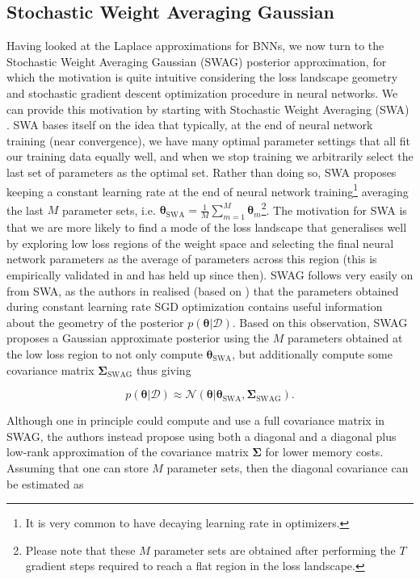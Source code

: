 \subsection{Stochastic Weight Averaging Gaussian}
\label{sec:SWAG}
Having looked at the Laplace approximations for BNNs, we now turn to the Stochastic Weight Averaging Gaussian (SWAG) \citep{2019_SWAG} posterior approximation, for which the motivation is quite intuitive considering the loss landscape geometry and stochastic gradient descent optimization procedure in neural networks. We can provide this motivation by starting with Stochastic Weight Averaging (SWA) \citep{2018_SWA}. SWA bases itself on the idea that typically, at the end of neural network training (near convergence), we have many optimal parameter settings that all fit our training data equally well, and when we stop training we arbitrarily select the last set of parameters as the optimal set. Rather than doing so, SWA proposes keeping a constant learning rate at the end of neural network training\footnote{It is very common to have decaying learning rate in optimizers.} averaging the last $M$ parameter sets, i.e. $\bm{\theta}_\text{SWA}=\frac{1}{M}\sum^M_{m=1}\bm{\theta}_m$\footnote{Please note that these $M$ parameter sets are obtained after performing the $T$ gradient steps required to reach a flat region in the loss landscape.}. The motivation for SWA is that we are more likely to find a mode of the loss landscape that generalises well by exploring low loss regions of the weight space and selecting the final neural network parameters as the average of parameters across this region (this is empirically validated in \cite{2018_SWA} and has held up since then). SWAG follows very easily on from SWA, as the authors in \cite{2019_SWAG} realised (based on \citep{2016_Chen,2017_Mandt}) that the parameters obtained during constant learning rate SGD optimization contains useful information about the geometry of the posterior $p(\bm{\theta}|\mathcal{D})$. Based on this observation, SWAG proposes a Gaussian approximate posterior using the $M$ parameters obtained at the low loss region to not only compute $\bm{\theta}_\text{SWA}$, but additionally compute some covariance matrix $\bm{\Sigma}_\text{SWAG}$ thus giving 

\begin{equation}
    p(\bm{\theta}|\mathcal{D})\approx \mathcal{N}(\bm{\theta}|\bm{\theta}_\text{SWA}, \bm{\Sigma}_\text{SWAG}).
\end{equation}

\noindent Although one in principle could compute and use a full covariance matrix in SWAG, the authors instead propose using both a diagonal and a diagonal plus low-rank approximation of the covariance matrix $\bm{\Sigma}$ for lower memory costs. Assuming that one can store $M$ parameter sets, then the diagonal covariance can be estimated as

